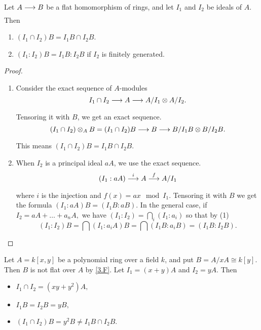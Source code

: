 \documentclass[../main]{subfiles}
\begin{document}
\newparagraph Let $A \varrightarrow{} B$ be a flat homomorphism of rings, and let $I_1$ and $I_2$ be ideals of $A.$ Then 
\begin{enumerate} [label=(\arabic*)]
    \item $(I_1 \cap I_2)B = I_1B \cap I_2B$.
    \item $(I_1 : I_2)B = I_1B : I_2B $ if $I_2$ is finitely generated.
\end{enumerate}

\begin{proof} 
    \begin{enumerate} [label=(\arabic*)]
        \item Consider the exact sequence of $A$-modules 
            \[
                I_1 \cap I_2 \varrightarrow{} A \varrightarrow{} A/ I_1 \otimes A/ I_2.
            \] 
            Tensoring it with $B$, we get an exact sequence. 
            \[
                (I_1 \cap I_2) \otimes_A B = (I_1\cap I_2)B \varrightarrow{} B \varrightarrow{} B/ I_1B \otimes B/ I_2B.
            \] 
            This means $(I_1 \cap I_2)B = I_1B \cap I_2B.$
        \item When $I_2$ is a principal ideal $aA$, we use the exact sequence. 
            \[
                (I_1:aA) \varrightarrow{i} A \varrightarrow{f} A/ I_1
            \] 
            where $i$ is the injection and $f(x) = ax \mod I_1$. Tensoring it with $B$ we get the formula $(I_1:aA)B = (I_1B:aB)$. In the general case, if $I_2=aA+ \ldots + a_nA,$ we have $(I_1:I_2) = \bigcap_i (I_1:a_i)$ so that by (1)
            \[
                (I_1 : I_2)B = \bigcap (I_1:a_iA)B = \bigcap (I_1B:a_iB) = (I_1B:I_2B).
            \] 
    \end{enumerate}
\end{proof}

\begin{parexample}     
    Let $A = k[x,y]$ be a polynomial ring over a field $k$, and put $B = A/ xA \cong k[y]$. Then $B$ is not flat over $A$ by \ref{3.F}. Let $I_1 = (x+y)A$ and $I_2=yA$. Then 
    \begin{itemize}
        \item  $I_1\cap I_2 = (xy + y^{2})A,$
        \item  $I_1B = I_2B = yB,$
        \item $(I_1 \cap I_2)B = y^{2}B \neq I_1B \cap I_2B.$
    \end{itemize}
\end{parexample}
\end{document}
